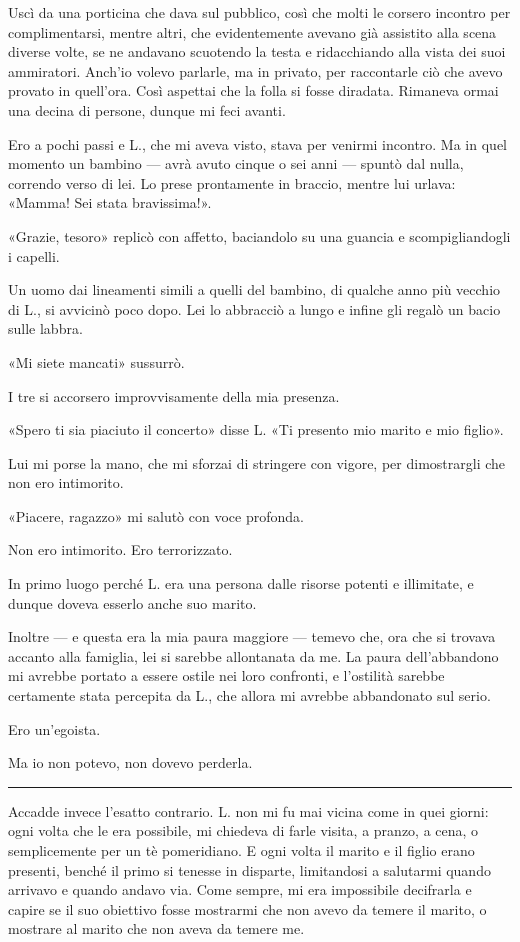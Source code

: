 Uscì da una porticina che dava sul pubblico, così che molti le corsero incontro per complimentarsi,
mentre altri, che evidentemente avevano già assistito alla scena diverse volte, se ne andavano
scuotendo la testa e ridacchiando alla vista dei suoi ammiratori. Anch'io volevo parlarle, ma in
privato, per raccontarle ciò che avevo provato in quell'ora. Così aspettai che la folla si fosse
diradata. Rimaneva ormai una decina di persone, dunque mi feci avanti.

Ero a pochi passi e L., che mi aveva visto, stava per venirmi incontro. Ma in quel momento un
bambino --- avrà avuto cinque o sei anni --- spuntò dal nulla, correndo verso di lei. Lo prese
prontamente in braccio, mentre lui urlava: «Mamma! Sei stata bravissima!».

«Grazie, tesoro» replicò con affetto, baciandolo su una guancia e scompigliandogli i capelli.

Un uomo dai lineamenti simili a quelli del bambino, di qualche anno più vecchio di L., si avvicinò
poco dopo. Lei lo abbracciò a lungo e infine gli regalò un bacio sulle labbra.

«Mi siete mancati» sussurrò.

I tre si accorsero improvvisamente della mia presenza.

«Spero ti sia piaciuto il concerto» disse L. «Ti presento mio marito e mio figlio».

Lui mi porse la mano, che mi sforzai di stringere con vigore, per dimostrargli che non ero
intimorito.

«Piacere, ragazzo» mi salutò con voce profonda.

Non ero intimorito. Ero terrorizzato.

In primo luogo perché L. era una persona dalle risorse potenti e illimitate, e dunque doveva esserlo
anche suo marito.

Inoltre --- e questa era la mia paura maggiore --- temevo che, ora che si trovava accanto alla
famiglia, lei si sarebbe allontanata da me. La paura dell'abbandono mi avrebbe portato a essere
ostile nei loro confronti, e l'ostilità sarebbe certamente stata percepita da L., che allora mi
avrebbe abbandonato sul serio.

Ero un'egoista.

Ma io non potevo, non dovevo perderla.

\plainbreak{1}

Accadde invece l'esatto contrario. L. non mi fu mai vicina come in quei giorni: ogni volta che le
era possibile, mi chiedeva di farle visita, a pranzo, a cena, o semplicemente per un tè pomeridiano.
E ogni volta il marito e il figlio erano presenti, benché il primo si tenesse in disparte,
limitandosi a salutarmi quando arrivavo e quando andavo via. Come sempre, mi era impossibile
decifrarla e capire se il suo obiettivo fosse mostrarmi che non avevo da temere il marito, o
mostrare al marito che non aveva da temere me.

